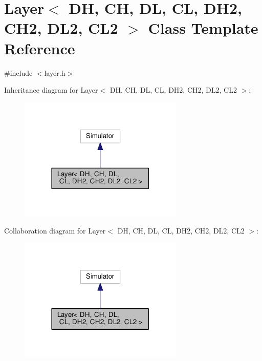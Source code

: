 \hypertarget{classLayer}{}\section{Layer$<$ DH, CH, DL, CL, D\+H2, C\+H2, D\+L2, C\+L2 $>$ Class Template Reference}
\label{classLayer}


{\ttfamily \#include $<$layer.\+h$>$}



Inheritance diagram for Layer$<$ DH, CH, DL, CL, D\+H2, C\+H2, D\+L2, C\+L2 $>$\+:
\nopagebreak
\begin{figure}[H]
\begin{center}
\leavevmode
\includegraphics[width=222pt]{classLayer__inherit__graph}
\end{center}
\end{figure}


Collaboration diagram for Layer$<$ DH, CH, DL, CL, D\+H2, C\+H2, D\+L2, C\+L2 $>$\+:
\nopagebreak
\begin{figure}[H]
\begin{center}
\leavevmode
\includegraphics[width=222pt]{classLayer__coll__graph}
\end{center}
\end{figure}
